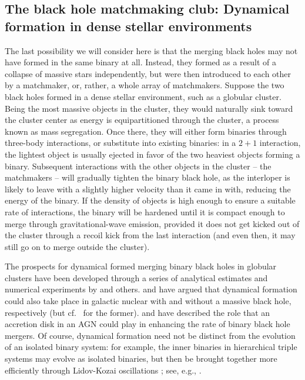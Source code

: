\documentclass[iop,onecolumn]{revtex4}
\begin{document}
\subsection{The black hole matchmaking club: Dynamical formation in dense stellar environments}

The last possibility we will consider here is that the merging black holes may not have formed in the same binary at all.  Instead, they formed as a result of a collapse of massive stars independently, but were then introduced to each other by a matchmaker, or, rather, a whole array of matchmakers.  Suppose the two black holes formed in a dense stellar environment, such as a globular cluster.  Being the most massive objects in the cluster, they would naturally sink toward the cluster center as energy is equipartitioned through the cluster, a process known as mass segregation.  Once there, they will either form binaries through three-body interactions, or substitute into existing binaries: in a $2+1$ interaction, the lightest object is usually ejected in favor of the two heaviest objects forming a binary.  Subsequent interactions with the other objects in the cluster -- the matchmakers -- will gradually tighten the binary black hole, as the interloper is likely to leave with a slightly higher velocity than it came in with, reducing the energy of the binary.   If the density of objects is high enough to ensure a suitable rate of interactions, the binary will be hardened until it is compact enough to merge through gravitational-wave emission, provided it does not get kicked out of the cluster through a recoil kick from the last interaction (and even then, it may still go on to merge outside the cluster).  

The prospects for dynamical formed merging binary black holes in globular clusters have been developed through a series of analytical estimates and numerical experiments by \citet{Sigurdsson:1993,Kulkarni:1993,PZwart:2000,OLeary:2006,Banerjee:2010,Downing:2011,Morscher:2015,Mapelli:2016,Rodriguez:2016} and others.  \citet{OLeary:2008} and \citet{MillerLauburg:2008} have argued that dynamical formation could also take place in galactic nuclear with and without a massive black hole, respectively (but cf.~\citet{Tsang:2013} for the former).  \citet{Bartos:2016} and \citet{Stone:2016} have described the role that an accretion disk in an AGN could play in enhancing the rate of binary black hole mergers. Of course, dynamical formation need not be distinct from the evolution of an isolated binary system: for example, the inner binaries in hierarchical triple systems may evolve as isolated binaries, but then be brought together more efficiently through Lidov-Kozai oscillations \citep{Lidov:1962,Kozai:1962}; see, e.g., \citet{PeretsKratter:2012,Belczynski:2014VMS}.
\end{document}
